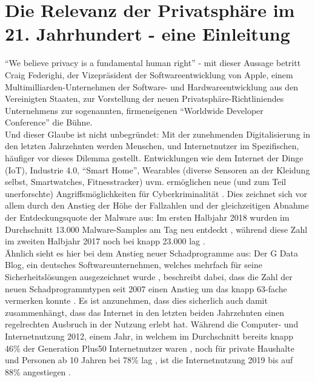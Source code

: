\chapter{Die Relevanz der Privatsphäre im 21. Jahrhundert - eine Einleitung} %
\label{Introduction} %

\enquote{We believe privacy is a fundamental human right} \cite{Apple:2020aa} - mit dieser Aussage betritt Craig Federighi, der Vizepräsident der Softwareentwicklung von Apple, einem Multimilliarden-Unternehmen der Software- und Hardwareentwicklung aus den Vereinigten Staaten, zur Vorstellung der 
neuen Privatsphäre-Richtliniendes Unternehmens zur sogenannten, firmeneigenen \enquote{Worldwide Developer Conference} die Bühne. \\ Und dieser Glaube ist nicht unbegründet: Mit der zunehmenden Digitalisierung in den letzten Jahrzehnten werden Menschen, und Internetnutzer im Spezifischen, 
häufiger vor dieses Dilemma gestellt. Entwicklungen wie dem Internet der Dinge (IoT), Industrie 4.0, \enquote{Smart Home}, Wearables (diverse Sensoren an der Kleidung selbst, Smartwatches, Fitnesstracker) uvm. ermöglichen neue (und zum Teil unerforschte) Angriffsmöglichkeiten für Cyberkriminalität \cite{Bundeskriminalamt:2018aa}.
Dies zeichnet sich vor allem durch den Anstieg der Höhe der Fallzahlen und der gleichzeitigen Abnahme der Entdeckungsquote der Malware aus: Im ersten Halbjahr 2018 wurden im Durchschnitt 13.000 Malware-Samples am Tag neu entdeckt \cite{GDB:18}, während diese Zahl im zweiten Halbjahr 2017 noch bei knapp 23.000 lag \cite{GDB:17}. \\ Ähnlich sieht es hier bei
dem Anstieg neuer Schadprogramme aus: Der G Data Blog, ein deutsches Softwareunternehmen, welches mehrfach für seine Sicherheitslösungen ausgezeichnet wurde \cite{GD:2020aa}, beschreibt dabei, dass die Zahl der neuen Schadprogrammtypen seit 2007 einen Anstieg um das knapp 63-fache vermerken konnte \cite{GDB:17}. 
Es ist anzunehmen, dass dies sicherlich auch damit zusammenhängt, dass das Internet in den letzten beiden Jahrzehnten einen regelrechten Ausbruch in der Nutzung erlebt hat. Während die Computer- und Internetnutzung 2012, einem Jahr, in welchem im Durchschnitt bereits knapp 46\% der Generation Plus50 Internetnutzer waren
\cite{GfK:2016aa}, noch für private Haushalte und Personen ab 10 Jahren bei 78\% lag \cite{Bundesamt:2019aa}, ist die Internetnutzung 2019 bis auf 88\% angestiegen \cite{Bundesamt:2019aa}. \\ \\
